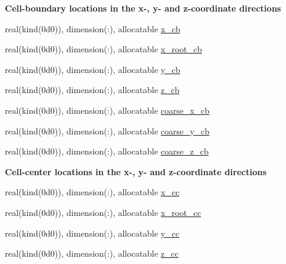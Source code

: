 \begin{Indent}\textbf{ Cell-\/boundary locations in the x-\/, y-\/ and z-\/coordinate directions}\par
\begin{DoxyCompactItemize}
\item 
real(kind(0d0)), dimension(\+:), allocatable \hyperlink{namespacem__global__parameters_abd9ada93ee5222de406111ee9c91ddf0}{x\+\_\+cb}
\item 
real(kind(0d0)), dimension(\+:), allocatable \hyperlink{namespacem__global__parameters_a44deb07824e0bcefed07571e50258d19}{x\+\_\+root\+\_\+cb}
\item 
real(kind(0d0)), dimension(\+:), allocatable \hyperlink{namespacem__global__parameters_aa436c56a050419e85c8c08611a688e63}{y\+\_\+cb}
\item 
real(kind(0d0)), dimension(\+:), allocatable \hyperlink{namespacem__global__parameters_a1f932e794cad6291b2e6c62b93dcf533}{z\+\_\+cb}
\item 
real(kind(0d0)), dimension(\+:), allocatable \hyperlink{namespacem__global__parameters_aef538f2e7f1cb4a0072fba0794efec40}{coarse\+\_\+x\+\_\+cb}
\item 
real(kind(0d0)), dimension(\+:), allocatable \hyperlink{namespacem__global__parameters_a17215aa76b13fd4cf185945c445dc88f}{coarse\+\_\+y\+\_\+cb}
\item 
real(kind(0d0)), dimension(\+:), allocatable \hyperlink{namespacem__global__parameters_ac5e4f1860cfc9d58840a935de349811e}{coarse\+\_\+z\+\_\+cb}
\end{DoxyCompactItemize}
\end{Indent}
\begin{Indent}\textbf{ Cell-\/center locations in the x-\/, y-\/ and z-\/coordinate directions}\par
\begin{DoxyCompactItemize}
\item 
real(kind(0d0)), dimension(\+:), allocatable \hyperlink{namespacem__global__parameters_aaf315f1df492ccc9daaeee046f185bb5}{x\+\_\+cc}
\item 
real(kind(0d0)), dimension(\+:), allocatable \hyperlink{namespacem__global__parameters_a94882b68d8ecf627c44e55c567659807}{x\+\_\+root\+\_\+cc}
\item 
real(kind(0d0)), dimension(\+:), allocatable \hyperlink{namespacem__global__parameters_ad7e05d3d526e5dfa14a74ffda890e63d}{y\+\_\+cc}
\item 
real(kind(0d0)), dimension(\+:), allocatable \hyperlink{namespacem__global__parameters_a2c4b9e99b981dc55cccf0b153159404e}{z\+\_\+cc}
\end{DoxyCompactItemize}
\end{Indent}
